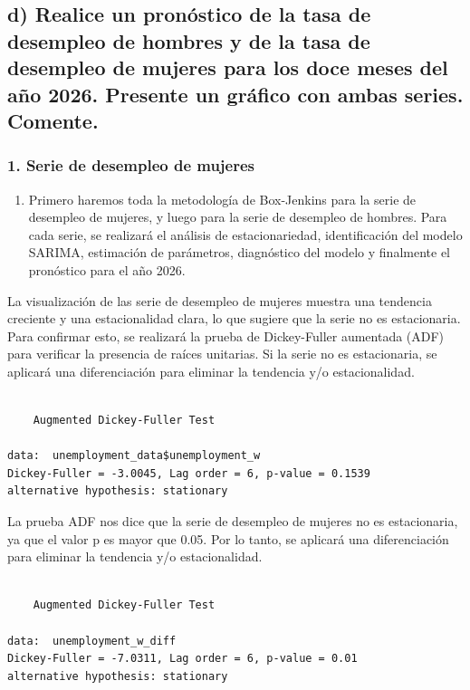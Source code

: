 \documentclass[
  11pt,
  letterpaper,
  DIV=11,
  numbers=noendperiod]{scrartcl}
\providecommand{\tightlist}{%
  \setlength{\itemsep}{0pt}\setlength{\parskip}{0pt}}
\begin{document}
\subsection{d) Realice un pronóstico de la tasa de desempleo de hombres
y de la tasa de desempleo de mujeres para los doce meses del año 2026.
Presente un gráfico con ambas series.
Comente.}\label{d-realice-un-pronuxf3stico-de-la-tasa-de-desempleo-de-hombres-y-de-la-tasa-de-desempleo-de-mujeres-para-los-doce-meses-del-auxf1o-2026.-presente-un-gruxe1fico-con-ambas-series.-comente.}

\subsubsection{1. Serie de desempleo de
mujeres}\label{serie-de-desempleo-de-mujeres}

\begin{enumerate}
\def\labelenumi{\arabic{enumi}.}
\tightlist
\item
  Primero haremos toda la metodología de Box-Jenkins para la serie de
  desempleo de mujeres, y luego para la serie de desempleo de hombres.
  Para cada serie, se realizará el análisis de estacionariedad,
  identificación del modelo SARIMA, estimación de parámetros,
  diagnóstico del modelo y finalmente el pronóstico para el año 2026.
\end{enumerate}

La visualización de las serie de desempleo de mujeres muestra una
tendencia creciente y una estacionalidad clara, lo que sugiere que la
serie no es estacionaria. Para confirmar esto, se realizará la prueba de
Dickey-Fuller aumentada (ADF) para verificar la presencia de raíces
unitarias. Si la serie no es estacionaria, se aplicará una
diferenciación para eliminar la tendencia y/o estacionalidad.

\begin{verbatim}

    Augmented Dickey-Fuller Test

data:  unemployment_data$unemployment_w
Dickey-Fuller = -3.0045, Lag order = 6, p-value = 0.1539
alternative hypothesis: stationary
\end{verbatim}

La prueba ADF nos dice que la serie de desempleo de mujeres no es
estacionaria, ya que el valor p es mayor que 0.05. Por lo tanto, se
aplicará una diferenciación para eliminar la tendencia y/o
estacionalidad.

\begin{verbatim}

    Augmented Dickey-Fuller Test

data:  unemployment_w_diff
Dickey-Fuller = -7.0311, Lag order = 6, p-value = 0.01
alternative hypothesis: stationary
\end{verbatim}
\end{document}
